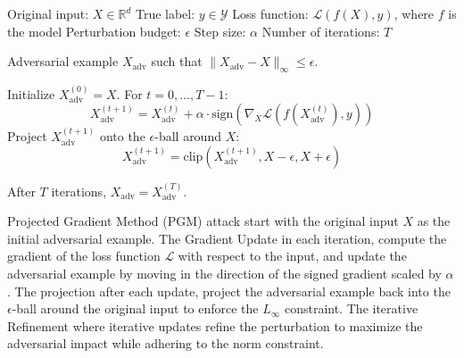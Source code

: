 
Original input: $X \in \mathbb{R}^d$
True label: $y \in \mathcal{Y}$
Loss function: $\mathcal{L}(f(X), y)$, where $f$ is the model
Perturbation budget: $\epsilon$
Step size: $\alpha$
Number of iterations: $T$

Adversarial example $X_{\text{adv}}$ such that $\|X_{\text{adv}} - X\|_\infty \leq \epsilon$.

Initialize $X^{(0)}_{\text{adv}} = X$. For $t = 0, \dots, T-1$:
\[
X^{(t+1)}_{\text{adv}} = X^{(t)}_{\text{adv}} + \alpha \cdot \text{sign}(\nabla_X \mathcal{L}(f(X^{(t)}_{\text{adv}}), y))
\]
Project $X^{(t+1)}_{\text{adv}}$ onto the $\epsilon$-ball around $X$:
\[
X^{(t+1)}_{\text{adv}} = \text{clip}(X^{(t+1)}_{\text{adv}}, X - \epsilon, X + \epsilon)
\]

After $T$ iterations, $X_{\text{adv}} = X^{(T)}_{\text{adv}}$.

Projected Gradient Method (PGM) attack start with the original input $X$ as the initial adversarial example. The Gradient Update in each iteration, compute the gradient of the loss function $\mathcal{L}$ with respect to the input, and update the adversarial example by moving in the direction of the signed gradient scaled by $\alpha$. The projection after each update, project the adversarial example back into the $\epsilon$-ball around the original input to enforce the $L_\infty$ constraint. The iterative Refinement where iterative updates refine the perturbation to maximize the adversarial impact while adhering to the norm constraint.